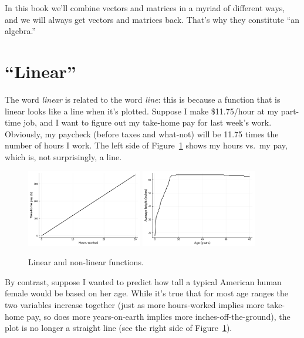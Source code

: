 In this book we'll combine vectors and matrices in a myriad of different ways,
and we will always get vectors and matrices back. That's why they constitute
``an algebra.''

\section{``Linear''}


The word \textit{linear} is related to the word \textit{line}: this is because
a function that is linear looks like a line when it's plotted. Suppose I make
\$11.75/hour at my part-time job, and I want to figure out my take-home pay for
last week's work. Obviously, my paycheck (before taxes and what-not) will be
11.75 times the number of hours I work. The left side of
Figure~\ref{fig:linearNLPlots} shows my hours vs.~my pay, which is, not
surprisingly, a line.

\begin{figure}[ht]
\centering
\includegraphics[width=0.45\textwidth]{linear.png}
\includegraphics[width=0.45\textwidth]{nonlinear.png}
\caption{Linear and non-linear functions.}
\label{fig:linearNLPlots}
\end{figure}

By contrast, suppose I wanted to predict how tall a typical American human
female would be based on her age. While it's true that for most age ranges the
two variables increase together (just as more hours-worked implies more
take-home pay, so does more years-on-earth implies more inches-off-the-ground),
the plot is no longer a straight line (see the right side of
Figure~\ref{fig:linearNLPlots}).

